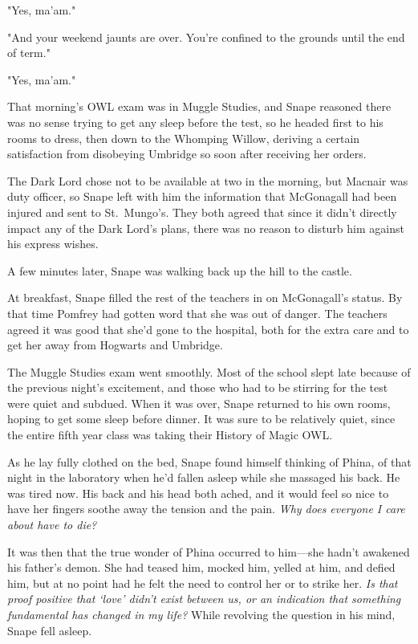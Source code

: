 "Yes, ma'am."

"And your weekend jaunts are over. You're confined to the grounds until the end of term."

"Yes, ma'am."

That morning's OWL exam was in Muggle Studies, and Snape reasoned there was no sense trying to get any sleep before the test, so he headed first to his rooms to dress, then down to the Whomping Willow, deriving a certain satisfaction from disobeying Umbridge so soon after receiving her orders.

The Dark Lord chose not to be available at two in the morning, but Macnair was duty officer, so Snape left with him the information that McGonagall had been injured and sent to St.~Mungo's. They both agreed that since it didn't directly impact any of the Dark Lord's plans, there was no reason to disturb him against his express wishes.

A few minutes later, Snape was walking back up the hill to the castle.

At breakfast, Snape filled the rest of the teachers in on McGonagall's status. By that time Pomfrey had gotten word that she was out of danger. The teachers agreed it was good that she'd gone to the hospital, both for the extra care and to get her away from Hogwarts and Umbridge.

The Muggle Studies exam went smoothly. Most of the school slept late because of the previous night's excitement, and those who had to be stirring for the test were quiet and subdued. When it was over, Snape returned to his own rooms, hoping to get some sleep before dinner. It was sure to be relatively quiet, since the entire fifth year class was taking their History of Magic OWL.

As he lay fully clothed on the bed, Snape found himself thinking of Phina, of that night in the laboratory when he'd fallen asleep while she massaged his back. He was tired now. His back and his head both ached, and it would feel so nice to have her fingers soothe away the tension and the pain. \emph{Why does everyone I care about have to die?}

It was then that the true wonder of Phina occurred to him—she hadn't awakened his father's demon. She had teased him, mocked him, yelled at him, and defied him, but at no point had he felt the need to control her or to strike her. \emph{Is that proof positive that `love' didn't exist between us, or an indication that something fundamental has changed in my life?} While revolving the question in his mind, Snape fell asleep.

